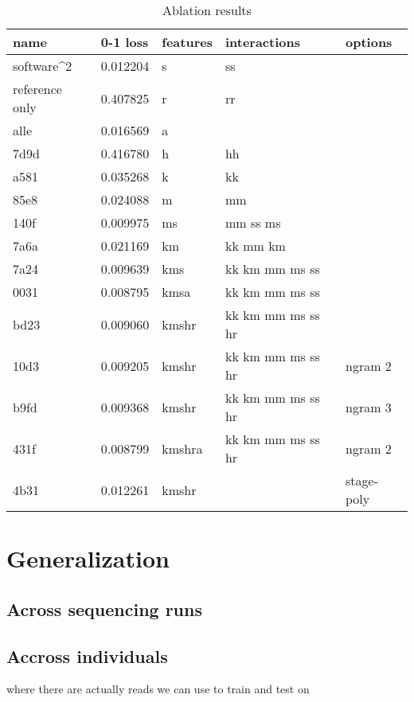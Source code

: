 \documentclass{article}
\begin{document}
\begin{table}[]
  \centering
  \caption{Ablation results}
  \label{ablation-results}
  \begin{tabular}{|l|l|l|l|l|}
    \hline
    name & 0-1 loss & features & interactions & options \\ \hline
    software^2 & 0.012204 & s & ss & \\
    reference only & 0.407825 & r & rr &\\
    alle & 0.016569 & a & & \\
    7d9d & 0.416780 & h & hh & \\
    a581 & 0.035268 & k & kk & \\
    85e8 & 0.024088 & m & mm & \\
    140f & 0.009975 & ms & mm  ss  ms & \\
    7a6a & 0.021169 & km & kk  mm  km & \\
    7a24 & 0.009639 & kms & kk  km  mm  ms  ss & \\
    0031 & 0.008795 & kmsa & kk  km  mm  ms  ss & \\
    bd23 & 0.009060 & kmshr & kk  km  mm  ms  ss  hr & \\
    10d3 & 0.009205 & kmshr & kk  km  mm  ms  ss  hr & ngram 2 \\
    b9fd & 0.009368 & kmshr & kk  km  mm  ms  ss  hr & ngram 3 \\
    431f & 0.008799 & kmshra & kk  km  mm  ms  ss  hr & ngram 2 \\
    4b31 & 0.012261 & kmshr & & stage-poly \\
    \hline
  \end{tabular}
\end{table}



\section{Generalization}

\subsection{Across sequencing runs}



\subsection{Accross individuals}
where there are actually reads we can use to train and test on
\end{document}
